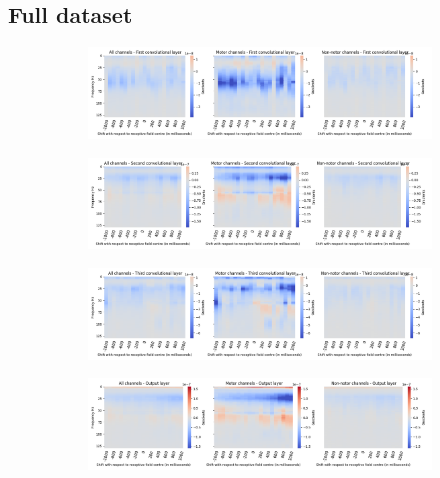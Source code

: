 \subsection*{Full dataset}\label{subsec:absVel-full-dataset-appendixC}
\begin{figure}[!htpb]
\centering
\begin{subfigure}[b]{\textwidth}
   \includegraphics[width=0.9\linewidth]{img/appendix/C/m/absVel/sbp0_m_shift_gradients_conv_2_all_kinds}
   \caption{}
   \label{fig:absVel-shifting-grads-conv-2}
\end{subfigure}

\begin{subfigure}[b]{\textwidth}
   \includegraphics[width=0.9\linewidth]{img/appendix/C/m/absVel/sbp0_m_shift_gradients_conv_3_all_kinds}
   \caption{}
   \label{fig:absVel-shifting-grads-conv-3}
\end{subfigure}

\begin{subfigure}[b]{\textwidth}
   \includegraphics[width=0.9\linewidth]{img/appendix/C/m/absVel/sbp0_m_shift_gradients_conv_4_all_kinds}
   \caption{}
   \label{fig:absVel-shifting-grads-conv-4}
\end{subfigure}

\begin{subfigure}[b]{\textwidth}
   \includegraphics[width=0.9\linewidth]{img/appendix/C/m/absVel/sbp0_m_shift_gradients_conv_classifier_all_kinds}
   \caption{}
   \label{fig:absVel-shifting-grads-conv-classifier}
\end{subfigure}


\end{figure}
